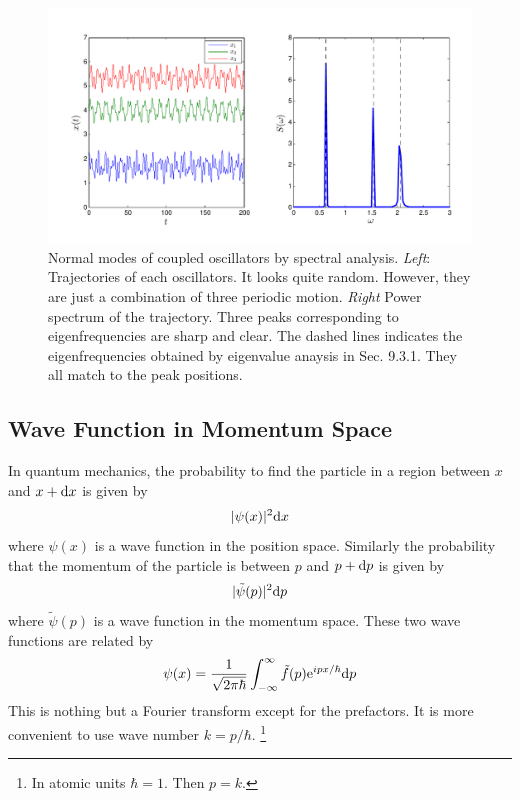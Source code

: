 \begin{figure}
\centering
\includegraphics[width=4.5in]{11.fft/coupled_springs_spectra.pdf}
\caption{Normal modes of coupled oscillators by spectral analysis. \textit{Left}:  Trajectories of each oscillators. It looks quite random.  However, they are just a combination of three periodic motion.  \textit{Right} Power spectrum of the trajectory.  Three peaks corresponding to eigenfrequencies are sharp and clear.  The dashed lines indicates the eigenfrequencies obtained by eigenvalue anaysis in Sec. 9.3.1.  They all match to the peak positions.}\label{fig:coupled_springs_speactra}
\end{figure}

\subsection{Wave Function in Momentum Space}

In quantum mechanics, the probability to find the particle in a region between $x$ and $x+\text{d} x$ is given by 
\begin{equation}
|\psi(x)|^2 \text{d} x
\end{equation}
where $\psi(x)$ is a wave function in the position space.
Similarly the probability that the momentum of the particle is between $p$ and $p + \text{d} p$ is given by
\begin{equation}
|\tilde{\psi}(p)|^2 \text{d} p
\end{equation}
where $\tilde{\psi}(p)$ is a wave function in the momentum space. These two wave functions are related by
\begin{equation}
\psi(x) = \frac{1}{\sqrt{2\pi \hbar}} \int_{-\infty}^{\infty} \tilde{f}(p) \text{e}^{i p x/\hbar} \text{d} p
\end{equation}
This is nothing but a Fourier transform except for the prefactors.  It is more convenient to use wave number $k=p/\hbar$. \footnote{In atomic units $\hbar=1$. Then $p=k$.}

